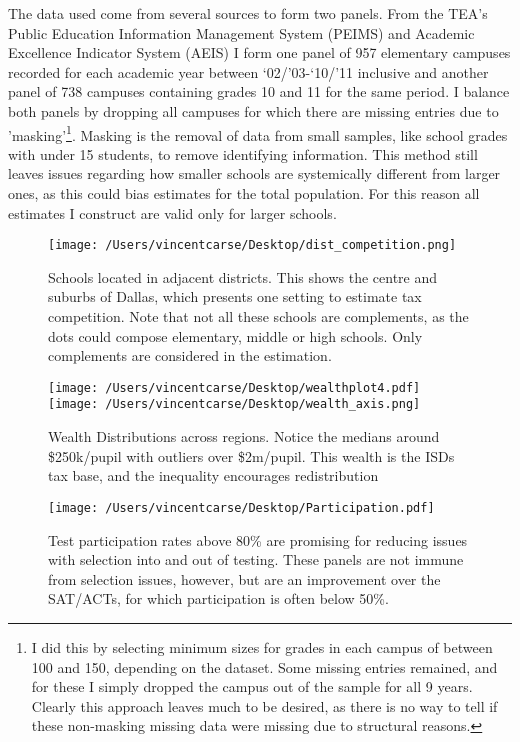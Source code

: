 \documentclass[11pt]{article}
\begin{document}
The data used come from several sources to form two panels. From the TEA’s Public Education Information Management System (PEIMS) and Academic Excellence Indicator System (AEIS) I form one panel of 957 elementary campuses recorded for each academic year between ‘02/’03-‘10/’11 inclusive and another panel of 738 campuses containing grades 10 and 11 for the same period.  I balance both panels by dropping all campuses for which there are missing entries due to 'masking'\footnote{I did this by selecting minimum sizes for grades in each campus of between 100 and 150, depending on the dataset. Some missing entries remained, and for these I simply dropped the campus out of the sample for all 9 years. Clearly this approach leaves much to be desired, as there is no way to tell if these non-masking missing data were missing due to structural reasons.}. Masking is the removal of data from small samples, like school grades with under 15 students, to remove identifying information. This method still leaves issues regarding how smaller schools are systemically different from larger ones, as this could bias estimates for the total population. For this reason all estimates I construct are valid only for larger schools.  

\begin{figure}
    \label{image-myimage}
    \texttt{[image: /Users/vincentcarse/Desktop/dist\_competition.png]}
    \caption{Schools located in adjacent districts. This shows the centre and suburbs of Dallas, which presents one setting to estimate tax competition. Note that not all these schools are complements, as the dots could compose elementary, middle or high schools. Only complements are considered in the estimation.}
\end{figure}

\begin{figure}
    \label{image-myimage}
    \texttt{[image: /Users/vincentcarse/Desktop/wealthplot4.pdf]}
    \texttt{[image: /Users/vincentcarse/Desktop/wealth\_axis.png]}
    \caption{Wealth Distributions across regions. Notice the medians around \$250k/pupil with outliers over \$2m/pupil. This wealth is the ISDs tax base, and the inequality encourages redistribution}
\end{figure}

\begin{figure}
    \label{image-myimage}
    \texttt{[image: /Users/vincentcarse/Desktop/Participation.pdf]}
    \caption{Test participation rates above 80\% are promising for reducing issues with selection into and out of testing. These panels are not immune from selection issues, however, but are an improvement over the SAT/ACTs, for which participation is often below 50\%.}
\end{figure}
\end{document}
